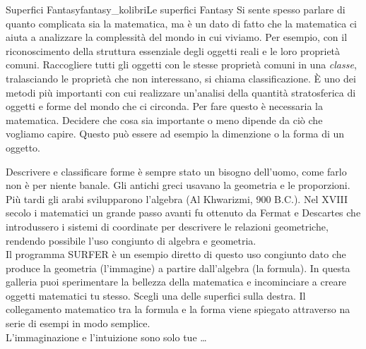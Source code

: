 \begin{surferIntroPage}{Superfici Fantasy}{fantasy_kolibri}{Le superfici Fantasy}
Si sente spesso parlare di quanto complicata sia la matematica, ma \`e un dato di fatto che la matematica ci aiuta a analizzare la complessit\`a del mondo in cui viviamo. Per esempio, con il riconoscimento della struttura essenziale degli oggetti reali e le loro propriet\`a comuni. Raccogliere tutti gli oggetti con le stesse propriet\`a comuni in una \textit{classe}, tralasciando le propriet\`a che non interessano, si chiama classificazione. \`E uno dei metodi pi\`u importanti con cui realizzare un'analisi della quantit\`a stratosferica di oggetti e forme del mondo che ci circonda. Per fare questo \`e necessaria la matematica. Decidere che cosa sia importante o meno dipende da ci\`o che vogliamo capire. Questo pu\`o essere ad esempio la dimenzione o la forma di un oggetto.
\\

\vspace{0.4cm}

Descrivere e classificare forme \`e sempre stato un bisogno dell'uomo, come farlo non \`e per niente banale. Gli antichi greci usavano la geometria e le proporzioni. Pi\`u tardi gli arabi svilupparono l'algebra (Al Khwarizmi, 900 B.C.). Nel XVIII secolo i matematici un grande passo avanti fu ottenuto da Fermat e Descartes che introdussero i sistemi di coordinate per descrivere le relazioni geometriche, rendendo possibile l'uso congiunto di algebra e geometria.
\\
\vspace{0.4cm}
Il programma SURFER \`e un esempio diretto di questo uso congiunto dato che produce la geometria (l'immagine) a partire dall'algebra (la formula).
In questa galleria puoi sperimentare la bellezza della matematica e incominciare a creare oggetti matematici tu stesso. Scegli una delle superfici sulla destra. Il collegamento matematico tra la formula e la forma viene spiegato attraverso na serie di esempi in modo semplice.\\
L'immaginazione e l'intuizione sono solo tue \dots
\end{surferIntroPage}
